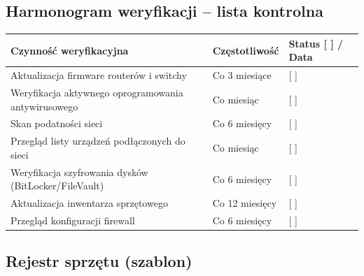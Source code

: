 \documentclass[12pt,a4paper]{article}
\begin{document}
\subsection{Harmonogram weryfikacji -- lista
kontrolna}\label{harmonogram-weryfikacji-lista-kontrolna}

\begin{longtable}[]{@{}>{\raggedright\arraybackslash}p{}>{\raggedright\arraybackslash}p{}>{\raggedright\arraybackslash}p{}@{}}
\toprule\noalign{}
Czynność weryfikacyjna & Częstotliwość & Status {[} {]} / Data \\
\midrule\noalign{}
\endhead
\bottomrule\noalign{}
\endlastfoot
Aktualizacja firmware routerów i switchy & Co 3 miesiące & {[} {]}
\underline{\hspace{2cm}} \\
Weryfikacja aktywnego oprogramowania antywirusowego & Co miesiąc & {[}
{]} \underline{\hspace{2cm}} \\
Skan podatności sieci & Co 6 miesięcy & {[} {]}
\underline{\hspace{2cm}} \\
Przegląd listy urządzeń podłączonych do sieci & Co miesiąc & {[} {]}
\underline{\hspace{2cm}} \\
Weryfikacja szyfrowania dysków (BitLocker/FileVault) & Co 6 miesięcy &
{[} {]} \underline{\hspace{2cm}} \\
Aktualizacja inwentarza sprzętowego & Co 12 miesięcy & {[} {]}
\underline{\hspace{2cm}} \\
Przegląd konfiguracji firewall & Co 6 miesięcy & {[} {]}
\underline{\hspace{2cm}} \\
\end{longtable}

\subsection{Rejestr sprzętu
(szablon)}\label{rejestr-sprzux119tu-szablon}
\end{document}
